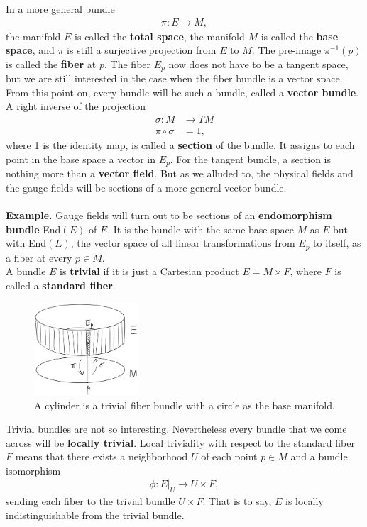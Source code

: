 \documentclass[aps,nofootinbib]{revtex4}
\begin{document}
In a more general bundle
\begin{align*}
\pi: E \to M,
\end{align*}
the manifold $E$ is called the {\bf total space}, the manifold $M$ is called the {\bf base space}, and $\pi$ is still a surjective projection from $E$ to $M$. The pre-image $\pi^{-1}(p)$ is called the {\bf fiber} at $p$. The fiber $E_p$ now does not have to be a tangent space, but we are still interested in the case when the fiber bundle is a vector space. From this point on, every bundle will be such a bundle, called a {\bf vector bundle}. A right inverse of the projection
\begin{align*}
\sigma : M &\to TM \\
	\pi \circ \sigma &= 1,
\end{align*}
where 1 is the identity map, is called a {\bf section} of the bundle. It assigns to each point in the base space a vector in $E_p$. For the tangent bundle, a section is nothing more than a {\bf vector field}. But as we alluded to, the physical fields and the gauge fields will be sections of a more general vector bundle. 
\\ \\ 
{\bf Example.} Gauge fields will turn out to be sections of an {\bf endomorphism bundle} End$(E)$ of $E$. It is the bundle with the same base space $M$ as $E$ but with End$(E)$, the vector space of all linear transformations from $E_p$ to itself, as a fiber at every $p \in M$. \\ 


A bundle $E$ is {\bf trivial} if it is just a Cartesian product $E = M \times F$, where $F$ is called a {\bf standard fiber}.
\begin{figure}
\includegraphics[width=0.35\textwidth]{fiber_bundle.png}
\caption{A cylinder is a trivial fiber bundle with a circle as the base manifold.}
\end{figure}
Trivial bundles are not so interesting. Nevertheless every bundle that we come across will be {\bf locally trivial}. Local triviality with respect to the standard fiber $F$ means that there exists a neighborhood $U$ of each point $p \in M$ and a bundle isomorphism
\begin{align*}
\phi: E\big|_U \to U \times F,
\end{align*}
sending each fiber to the trivial bundle $U \times F$. That is to say, $E$ is locally indistinguishable from the trivial bundle.
\end{document}
